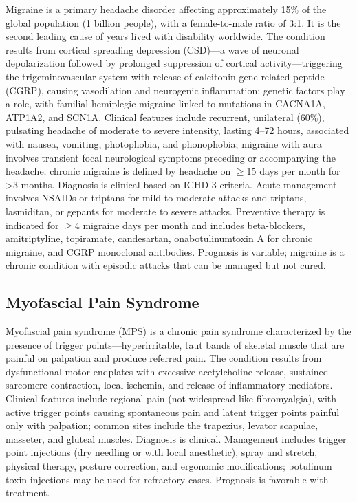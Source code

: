 Migraine is a primary headache disorder affecting approximately 15\% of the global population (1 billion people), with a female-to-male ratio of 3:1. It is the second leading cause of years lived with disability worldwide. The condition results from cortical spreading depression (CSD)---a wave of neuronal depolarization followed by prolonged suppression of cortical activity---triggering the trigeminovascular system with release of calcitonin gene-related peptide (CGRP), causing vasodilation and neurogenic inflammation; genetic factors play a role, with familial hemiplegic migraine linked to mutations in CACNA1A, ATP1A2, and SCN1A. Clinical features include recurrent, unilateral (60\%), pulsating headache of moderate to severe intensity, lasting 4--72 hours, associated with nausea, vomiting, photophobia, and phonophobia; migraine with aura involves transient focal neurological symptoms preceding or accompanying the headache; chronic migraine is defined by headache on $\ge$15 days per month for >3 months. Diagnosis is clinical based on ICHD-3 criteria. Acute management involves NSAIDs or triptans for mild to moderate attacks and triptans, lasmiditan, or gepants for moderate to severe attacks. Preventive therapy is indicated for $\ge$4 migraine days per month and includes beta-blockers, amitriptyline, topiramate, candesartan, onabotulinumtoxin A for chronic migraine, and CGRP monoclonal antibodies. Prognosis is variable; migraine is a chronic condition with episodic attacks that can be managed but not cured.

\subsection{Myofascial Pain Syndrome}
\label{sec:Myofascial Pain Syndrome}
Myofascial pain syndrome (MPS) is a chronic pain syndrome characterized by the presence of trigger points---hyperirritable, taut bands of skeletal muscle that are painful on palpation and produce referred pain. The condition results from dysfunctional motor endplates with excessive acetylcholine release, sustained sarcomere contraction, local ischemia, and release of inflammatory mediators. Clinical features include regional pain (not widespread like fibromyalgia), with active trigger points causing spontaneous pain and latent trigger points painful only with palpation; common sites include the trapezius, levator scapulae, masseter, and gluteal muscles. Diagnosis is clinical. Management includes trigger point injections (dry needling or with local anesthetic), spray and stretch, physical therapy, posture correction, and ergonomic modifications; botulinum toxin injections may be used for refractory cases. Prognosis is favorable with treatment.

